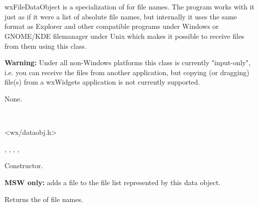 \section{}\label{wxfiledataobject}

wxFileDataObject is a specialization of  
for file names. The program works with it just as if it were a list of absolute file
names, but internally it uses the same format as
Explorer and other compatible programs under Windows or GNOME/KDE filemanager
under Unix which makes it possible to receive files from them using this
class.

{\bf Warning:} Under all non-Windows platforms this class is currently
"input-only", i.e. you can receive the files from another application, but
copying (or dragging) file(s) from a wxWidgets application is not currently
supported.


None.


\\


<wx/dataobj.h>


, 
, 
, 
, 


\label{wxfiledataobjectwxfiledataobject}


Constructor.

\label{wxfiledataobjectaddfile}


{\bf MSW only:} adds a file to the file list represented by this data object.

\label{wxfiledataobjectgetfilenames}


Returns the  of file names.

